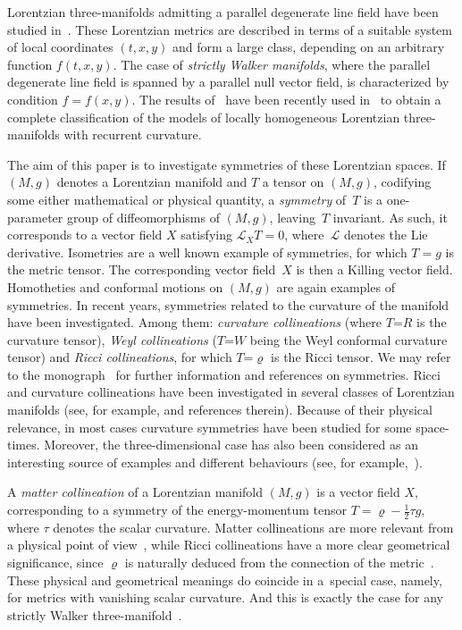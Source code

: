 \documentclass[pdftex]{sigma}
\numberwithin{equation}{section}
\begin{document}
Lorentzian three-manifolds admitting a parallel degenerate line f\/ield have been studied in~\cite{ChGRVA}. These Lorentzian metrics are described in terms of a suitable system of local coordinates $(t,x,y)$ and form a large class, depending on an arbitrary function $f(t,x,y)$. The case of {\em strictly Walker manifolds}, where the parallel degenerate line f\/ield is spanned by a parallel null vector f\/ield, is characterized by condition $f=f(x,y)$. The results of~\cite{ChGRVA} have been recently used in~\cite{GGN} to obtain a complete classif\/ication of the models of locally homogeneous Lorentzian three-manifolds with recurrent curvature.

The aim of this paper is to investigate symmetries of these Lorentzian spaces. If $(M,g)$ denotes a Lorentzian manifold and $T$ a tensor on $(M,g)$, codifying some either mathematical or physical quantity, a {\em symmetry} of~$T$ is a one-parameter group of dif\/feomorphisms of $(M,g)$, leaving~$T$ invariant. As such, it corresponds to a vector f\/ield $X$ satisfying $\mathcal L_X T=0$, where~$\mathcal L$ denotes the Lie derivative. Isometries are a well known example of symmetries, for which $T=g$ is the metric tensor. The corresponding vector f\/ield~$X$ is then a Killing vector f\/ield. Homotheties and conformal motions on $(M,g)$ are again examples of symmetries. In recent years, symmetries related to the curvature of the manifold have been investigated. Among them: {\em curvature collineations} (where $T$=$R$ is the curvature tensor), {\em Weyl collineations} ($T$=$W$ being the Weyl conformal curvature tensor) and {\em Ricci collineations}, for which $T$=$\varrho$ is the Ricci tensor. We may refer to the monograph~\cite{Hall} for further information and references on symmetries. Ricci {and curvature} collineations have been investigated in several classes of Lorentzian manifolds (see, for example, \cite{Heic,CZ1,CZ2,CSVV,CHK,FPP,Ha,HC,HLP,HRV,KR,L,TA} and references therein). Because of their physical relevance, in most cases curvature symmetries have been studied for some space-times. Moreover, the three-dimensional case has also been considered as an interesting source of examples and dif\/ferent behaviours (see, for example,~\cite{CSVV}).

A {\em matter collineation} of a Lorentzian manifold $(M,g)$ is a vector f\/ield $X$, corresponding to a symmetry of the energy-momentum tensor $T = \varrho- \frac{1}{2}\tau g$, where $\tau$ denotes the scalar curvature. Matter collineations are more relevant from a physical point of view~\cite{CS,CCV}, while Ricci collineations have a more clear geometrical signif\/icance, since $\varrho$ is naturally deduced from the connection of the metric~\cite{HRV}. These physical and geometrical meanings do coincide in a~special case, namely, for metrics with vanishing scalar curvature. And this is exactly the case for any strictly Walker three-manifold~\cite{ChGRVA}.
\end{document}
